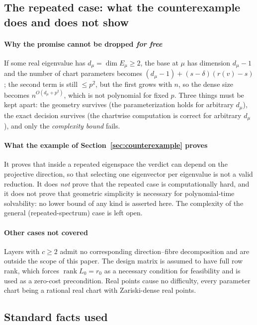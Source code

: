 \documentclass[journal]{IEEEtran}
\theoremstyle{plainn}
\theoremstyle{remark}
\newcommand{\rank}{\operatorname{rank}}
\begin{document}
\subsection{The repeated case: what the counterexample does and does not show}\label{sec5:sub:scope}

\paragraph{Why the promise cannot be dropped \emph{for free}} If some real eigenvalue has
$d_\mu=\dim E_\mu\ge2$, the base at $\mu$ has dimension $d_\mu-1$ and the number of chart parameters
becomes $(d_\mu-1)+(s-\delta)(r(v)-s)$; the second term is still $\le p^{2}$, but the first grows with
$n$, so the dense size becomes $n^{O(d_\mu+p^{2})}$, which is not polynomial for fixed $p$. Three
things must be kept apart: the geometry survives (the parameterization holds for arbitrary $d_\mu$),
the exact decision survives (the chartwise computation is correct for arbitrary $d_\mu$), and only the
\emph{complexity bound} fails.

\paragraph{What the example of Section~\ref{sec:counterexample} proves} It proves that inside a
repeated eigenspace the verdict can depend on the projective direction, so that selecting one
eigenvector per eigenvalue is not a valid reduction. It does \emph{not} prove that the repeated case is
computationally hard, and it does not prove that geometric simplicity is necessary for polynomial-time
solvability: no lower bound of any kind is asserted here. The complexity of the general
(repeated-spectrum) case is left open.

\paragraph{Other cases not covered} Layers with $c\ge2$ admit no corresponding direction--fibre
decomposition and are outside the scope of this paper. The design matrix is assumed to have full row
rank, which forces $\rank L_0=r_0$ as a necessary condition for feasibility and is used as a zero-cost
precondition. Real points cause no difficulty, every parameter chart being a rational real chart with
Zariski-dense real points.

\subsection{Standard facts used}\label{sec5:sub:facts}
\end{document}
